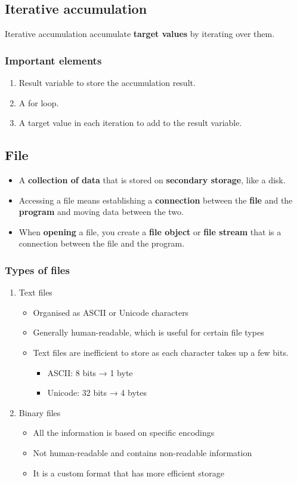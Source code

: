 \documentclass[11pt]{article}
\begin{document}
 \newpage
\subsection{Iterative accumulation}
\label{sec:orgcf0b8e1}
Iterative accumulation accumulate \textbf{target values} by iterating over them.
\subsubsection{Important elements}
\label{sec:org6932f0c}
\begin{enumerate}
\item Result variable to store the accumulation result.
\item A for loop.
\item A target value in each iteration to add to the result variable.
\end{enumerate}
\subsection{File}
\label{sec:orga01d4b2}
\begin{itemize}
\item A \textbf{collection of data} that is stored on \textbf{secondary storage}, like a disk.
\item Accessing a file means establishing a \textbf{connection} between the \textbf{file} and the \textbf{program} and moving data between the two.
\item When \textbf{opening} a file, you create a \textbf{file object} or \textbf{file stream} that is a connection between the file and the program.
\end{itemize}
\subsubsection{Types of files}
\label{sec:orgb150c83}
\begin{enumerate}
\item Text files
\begin{itemize}
\item Organised as ASCII or Unicode characters
\item Generally human-readable, which is useful for certain file types
\item Text files are inefficient to store as each character takes up a few bits.
\begin{itemize}
\item ASCII: 8 bits → 1 byte
\item Unicode: 32 bits → 4 bytes
\end{itemize}
\end{itemize}

\item Binary files
\begin{itemize}
\item All the information is based on specific encodings
\item Not human-readable and contains non-readable information
\item It is a custom format that has more efficient storage
\end{itemize}
\end{enumerate}
\end{document}
